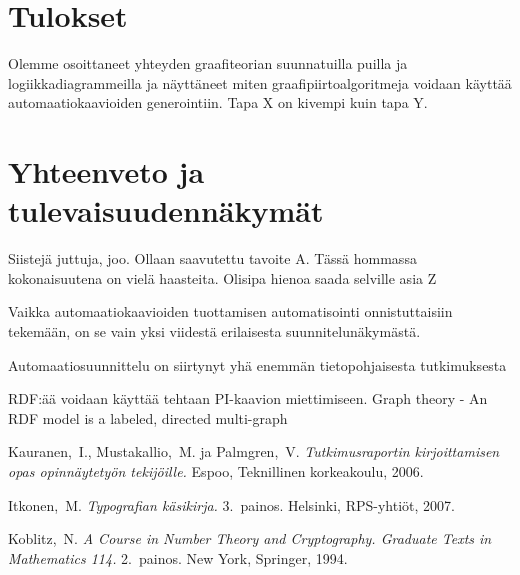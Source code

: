 \documentclass[finnish,12pt]{article}
\begin{document}
	\section{Tulokset}
	
Olemme osoittaneet yhteyden graafiteorian suunnatuilla puilla ja logiikkadiagrammeilla ja näyttäneet miten graafipiirtoalgoritmeja voidaan käyttää automaatiokaavioiden generointiin.
Tapa X on kivempi kuin tapa Y.

	\section{Yhteenveto ja tulevaisuudennäkymät}
	
Siistejä juttuja, joo. Ollaan saavutettu tavoite A. Tässä hommassa kokonaisuutena on vielä haasteita. Olisipa hienoa saada selville asia Z

Vaikka automaatiokaavioiden tuottamisen automatisointi onnistuttaisiin tekemään, on se vain yksi viidestä erilaisesta suunnitelunäkymästä.

Automaatiosuunnittelu on siirtynyt yhä enemmän tietopohjaisesta tutkimuksesta

RDF:ää voidaan käyttää tehtaan PI-kaavion miettimiseen.
Graph theory - An RDF model is a labeled, directed multi-graph


\clearpage
{}

\begin{thebibliography}{99}
	 Kauranen,\ I., Mustakallio,\ M. ja Palmgren,\ V.
	  \textit{Tutkimusraportin kirjoittamisen opas opinnäytetyön
		tekijöille.}  Espoo, Teknillinen korkeakoulu, 2006.

	 Itkonen,\ M. \textit{Typografian käsikirja.} 3.\
	  painos.  Helsinki, RPS-yhtiöt, 2007.

	 Koblitz,\ N. \textit{A Course in Number Theory and
		Cryptography. Graduate Texts in Mathematics 114.}  2.\ painos. New
	  York, Springer, 1994.

	\end{thebibliography}
\end{document}
